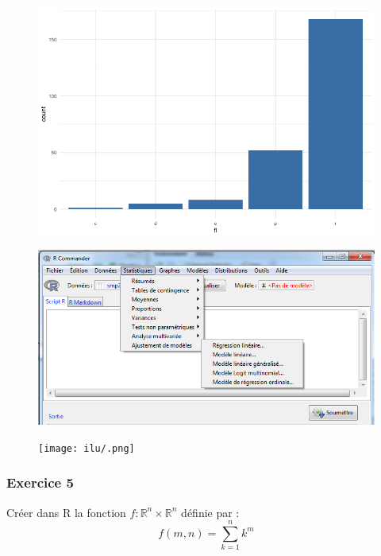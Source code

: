 \begin{figure}[H]\begin{center}\includegraphics[scale=1 ]{ilu/bg34.png}\end{center}\end{figure}

\begin{figure}[H]\begin{center}\includegraphics[scale=1 ]{ilu/bg.png}\end{center}\end{figure}




\begin{figure}[H]\begin{center}\texttt{[image: ilu/.png]}\end{center}\end{figure}



\subsubsection{Exercice 5}
Créer dans R la fonction $f : \mathbb{R}^{n} \times \mathbb{R}^{n}$ définie par :
$$f(m,n)=\sum_{k=1}^{n} k^{m}$$



